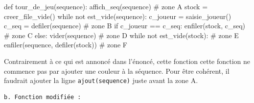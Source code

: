 \documentclass[
  letterpaper,
  DIV=11,
  numbers=noendperiod]{scrartcl}
\newenvironment{Shaded}{\begin{snugshade}}{\end{snugshade}}
\newcommand{\CommentTok}[1]{\textcolor[rgb]{0.37,0.37,0.37}{#1}}
\newcommand{\ControlFlowTok}[1]{\textcolor[rgb]{0.00,0.23,0.31}{#1}}
\newcommand{\KeywordTok}[1]{\textcolor[rgb]{0.00,0.23,0.31}{#1}}
\newcommand{\NormalTok}[1]{\textcolor[rgb]{0.00,0.23,0.31}{#1}}
\newcommand{\OperatorTok}[1]{\textcolor[rgb]{0.37,0.37,0.37}{#1}}
\begin{document}
\begin{enumerate}
\begin{Shaded}
\begin{Highlighting}[]
\KeywordTok{def}\NormalTok{ tour\_de\_jeu(sequence):}
\NormalTok{    affich\_seq(sequence) }\CommentTok{\# zone A}
\NormalTok{    stock }\OperatorTok{=}\NormalTok{ creer\_file\_vide()}
    \ControlFlowTok{while} \KeywordTok{not}\NormalTok{ est\_vide(sequence):}
\NormalTok{        c\_joueur }\OperatorTok{=}\NormalTok{ saisie\_joueur()}
\NormalTok{        c\_seq }\OperatorTok{=}\NormalTok{ defiler(sequence) }\CommentTok{\# zone B}
        \ControlFlowTok{if}\NormalTok{ c\_joueur }\OperatorTok{==}\NormalTok{ c\_seq:}
\NormalTok{            enfiler(stock, c\_seq) }\CommentTok{\# zone C}
        \ControlFlowTok{else}\NormalTok{:}
\NormalTok{            vider(sequence) }\CommentTok{\# zone D}
    \ControlFlowTok{while} \KeywordTok{not}\NormalTok{ est\_vide(stock): }\CommentTok{\# zone E}
\NormalTok{        enfiler(sequence, defiler(stock)) }\CommentTok{\# zone F}
\end{Highlighting}
\end{Shaded}
\end{enumerate}

\begin{tcolorbox}[enhanced jigsaw, opacityback=0, rightrule=.15mm, left=2mm, titlerule=0mm, leftrule=.75mm, colframe=quarto-callout-important-color-frame, toptitle=1mm, arc=.35mm, colbacktitle=quarto-callout-important-color!10!white, breakable, title=\textcolor{quarto-callout-important-color}{\faExclamation}\hspace{0.5em}{Important}, bottomtitle=1mm, toprule=.15mm, bottomrule=.15mm, opacitybacktitle=0.6, colback=white, coltitle=black]

Contrairement à ce qui est annoncé dans l'énoncé, cette fonction cette
fonction ne commence pas par ajouter une couleur à la séquence. Pour
être cohérent, il faudrait ajouter la ligne \texttt{ajout(sequence)}
juste avant la zone A.

\end{tcolorbox}

\begin{verbatim}
b. Fonction modifiée :
\end{verbatim}
\end{document}
